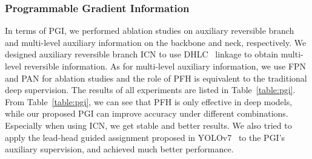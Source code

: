 \documentclass[10pt,twocolumn,letterpaper]{article}
\begin{document}
	\newpage
	
	\subsubsection{Programmable Gradient Information}
	
	In terms of PGI, we performed ablation studies on auxiliary reversible branch and multi-level auxiliary information on the backbone and neck, respectively.  We designed auxiliary reversible branch ICN to use DHLC~\cite{liang2021cbnetv2} linkage to obtain multi-level reversible information.  As for multi-level auxiliary information, we use FPN and PAN for ablation studies and the role of PFH is equivalent to the traditional deep supervision.  The results of all experiments are listed in Table~\ref{table:pgi}.  From Table~\ref{table:pgi}, we can see that PFH is only effective in deep models, while our proposed PGI can improve accuracy under different combinations.  Especially when using ICN, we get stable and better results.  We also tried to apply the lead-head guided assignment proposed in YOLOv7~\cite{wang2023yolov7} to the PGI's auxiliary supervision, and achieved much better performance.
	
\end{document}
